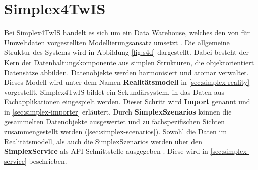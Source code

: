 \section{Simplex4TwIS}

Bei Simplex4TwIS handelt es sich um ein Data Warehouse, welches den von \textcite{rudolfUmweltdatenmanagementGeoInspiration2018} für Umweltdaten vorgestellten Modellierungsansatz umsetzt \parencite{grossmannFachsystemeSchemaevolution2024}. Die allgemeine Struktur des Systems wird in Abbildung \ref{fig:s4d} dargestellt. Dabei besteht der Kern der Datenhaltungskomponente aus simplen Strukturen, die objektorientiert Datensätze abbilden. Datenobjekte werden harmonisiert und atomar verwaltet. Dieses Modell wird unter dem Namen \textbf{Realitätsmodell} in \ref{sec:simplex-reality} vorgestellt. Simplex4TwIS bildet ein Sekundärsystem, in das Daten aus Fachapplikationen eingespielt werden. Dieser Schritt wird \textbf{Import} genannt und in \ref{sec:simplex-importer} erläutert. Durch \textbf{SimplexSzenarios} können die gesammelten Datenobjekte ausgewertet und zu fachspezifischen Sichten zusammengestellt werden (\ref{sec:simplex-scenarios}). Sowohl die Daten im Realitätsmodell, als auch die SimplexSzenarios werden über den \textbf{SimplexService} als \acs{API}-Schnittstelle ausgegeben \parencite{grossmannEnvVisioService2022}. Diese wird in \ref{sec:simplex-service} beschrieben.

